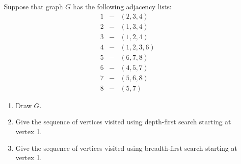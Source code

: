 Suppose that graph $G$  has the following adjacency lists:
%
\begin{eqnarray*}
 1 & - & (2,3,4) \\
  2 & - & (1,3,4) \\
  3 & - & (1,2,4) \\
  4 & - & (1,2,3,6) \\
  5 & - & (6,7,8) \\
  6 & - & (4,5,7) \\
  7 & - & (5,6,8) \\
  8 & - & (5,7)
\end{eqnarray*}
%
\begin{enumerate}

\item  Draw $G$.

\item  Give the sequence of vertices visited using depth-first search starting at vertex 1.

\item  Give the sequence of vertices visited using breadth-first search
starting at vertex 1.

\end{enumerate}
